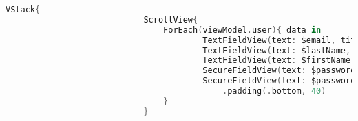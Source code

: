\begin{minipage}{\textwidth}
\begin{lstlisting}[language=swift]
                        VStack{
                            ScrollView{
                                ForEach(viewModel.user){ data in
                                        TextFieldView(text: $email, title: "Email")
                                        TextFieldView(text: $lastName, title: "Last name")
                                        TextFieldView(text: $firstName, title: "First name")
                                        SecureFieldView(text: $password, title: "Password")
                                        SecureFieldView(text: $passwordConfirmation, title: "Password confirmation")
                                            .padding(.bottom, 40)
                                }
                            }
    \end{lstlisting}   
\end{minipage}

